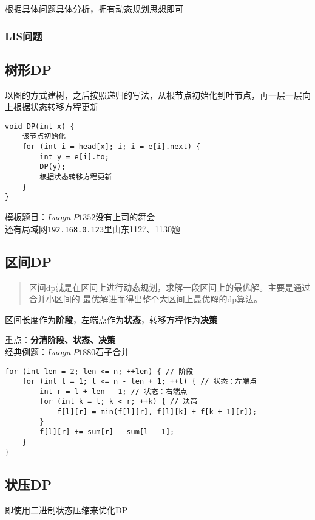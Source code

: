 \documentclass[UTF8]{ctexart}
\begin{document}
根据具体问题具体分析，拥有动态规划思想即可

\subsubsection{LIS问题}



\subsection{树形DP}

以图的方式建树，之后按照递归的写法，从根节点初始化到叶节点，再一层一层向上根据状态转移方程更新

\begin{lstlisting}
void DP(int x) {
    该节点初始化
    for (int i = head[x]; i; i = e[i].next) {
        int y = e[i].to;
        DP(y);
        根据状态转移方程更新
    }
}
\end{lstlisting}

模板题目：$Luogu\ P1352$没有上司的舞会\\
还有局域网\texttt{192.168.0.123}里山东1127、1130题

\subsection{区间DP}
\begin{quote}
	区间dp就是在区间上进行动态规划，求解一段区间上的最优解。主要是通过合并小区间的 最优解进而得出整个大区间上最优解的dp算法。
\end{quote}

区间长度作为\textbf{阶段}，左端点作为\textbf{状态}，转移方程作为\textbf{决策}

重点：\textbf{分清阶段、状态、决策}\\

经典例题：$Luogu\ P1880$石子合并

\begin{lstlisting}
for (int len = 2; len <= n; ++len) { // 阶段
    for (int l = 1; l <= n - len + 1; ++l) { // 状态：左端点
        int r = l + len - 1; // 状态：右端点
        for (int k = l; k < r; ++k) { // 决策
            f[l][r] = min(f[l][r], f[l][k] + f[k + 1][r]);
        }
        f[l][r] += sum[r] - sum[l - 1];
    }
}
\end{lstlisting}

\subsection{状压DP}
即使用二进制状态压缩来优化DP
\end{document}
